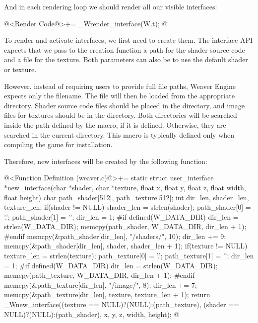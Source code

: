 And in each rendering loop we should render all our visible
interfaces:

\iniciocodigo
@<Render Code@>+=
_Wrender_interface(W.t);
@
\fimcodigo

To render and activate interfaces, we first need to create them. The
interface API expects that we pass to the creation function a path for
the shader source code and a file for the texture. Both parameters can
also be  to use the default shader or texture.

However, instead of requiring users to provide full file paths, Weaver
Engine expects only the filename. The file will then be loaded from
the appropriate directory. Shader source code files should be placed
in the  directory, and image files for textures
should be in the  directory. Both directories will
be searched inside the path defined by the 
macro, if it is defined. Otherwise, they are searched in the current
directory. This macro is typically defined only when compiling the
game for installation.

Therefore, new interfaces will be created by the following function:

\iniciocodigo
@<Function Definition (weaver.c)@>+=
static struct user_interface *new_interface(char *shader, char *texture,
                                            float x, float y, float z,
                                            float width, float height){
  char path_shader[512], path_texture[512];
  int dir_len, shader_len, texture_len;
  if(shader != NULL){
    shader_len = strlen(shader);
    path_shader[0] = '.';
    path_shader[1] = '\0';
    dir_len = 1;
#if defined(W_DATA_DIR)
    dir_len = strlen(W_DATA_DIR);
    memcpy(path_shader, W_DATA_DIR, dir_len + 1);
#endif
    memcpy(&path_shader[dir_len], "/shaders/", 10);
    dir_len += 9;
    memcpy(&path_shader[dir_len], shader, shader_len + 1);
  }
  if(texture != NULL){
    texture_len = strlen(texture);
    path_texture[0] = '.';
    path_texture[1] = '\0';
    dir_len = 1;
#if defined(W_DATA_DIR)
    dir_len = strlen(W_DATA_DIR);
    memcpy(path_texture, W_DATA_DIR, dir_len + 1);
#endif
    memcpy(&path_texture[dir_len], "/image/", 8);
    dir_len += 7;
    memcpy(&path_texture[dir_len], texture, texture_len + 1);
  }  
  return _Wnew_interface((texture == NULL)?(NULL):(path_texture),
                         (shader == NULL)?(NULL):(path_shader),
                         x, y, z, width, height);
}
@
\fimcodigo

